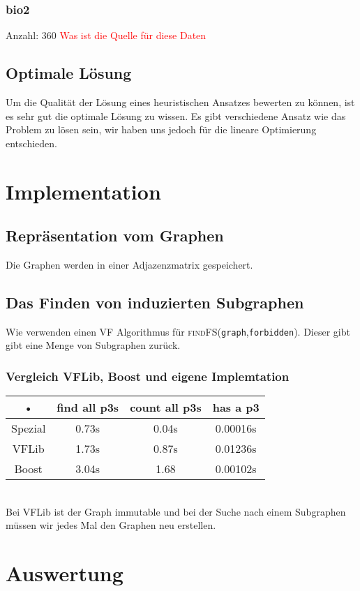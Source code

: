 \documentclass[12pt,a4paper,onecolumn,oneside,titlepage]{article}
\newcommand{\vars}{\texttt}
\newcommand{\func}{\textsc}
\newcommand\todo[1]{\textcolor{red}{#1}}
\begin{document}
\subsubsection{bio2}
Anzahl: 360
\todo{Was ist die Quelle für diese Daten}

\subsection{Optimale Lösung}
Um die Qualität der Lösung eines heuristischen Ansatzes bewerten zu können, ist es sehr gut die optimale Lösung zu wissen. Es gibt verschiedene Ansatz wie das Problem zu lösen sein, wir haben uns jedoch für die lineare Optimierung entschieden. 

\section{Implementation}
\subsection{Repräsentation vom Graphen}
Die Graphen werden in einer Adjazenzmatrix gespeichert.


\subsection{Das Finden von induzierten Subgraphen}
\cite{Ullmann76}
Wie verwenden einen VF Algorithmus für \func{findFS}(\vars{graph},\vars{forbidden}).
Dieser gibt gibt eine Menge von Subgraphen zurück.

\subsubsection{Vergleich VFLib, Boost und eigene Implemtation}
\begin{tabular}{|c|c|c|c|}
\hline 
• & find all p3s & count all p3s & has a p3 \\ 
\hline 
Spezial & 0.73s & 0.04s & 0.00016s \\ 
\hline 
VFLib & 1.73s & 0.87s & 0.01236s \\ 
\hline 
Boost & 3.04s & 1.68 & 0.00102s \\ 
\hline 
\end{tabular} 
\\

Bei VFLib ist der Graph immutable und bei der Suche nach einem  Subgraphen müssen wir jedes Mal den Graphen neu erstellen.


\section{Auswertung}
\end{document}
